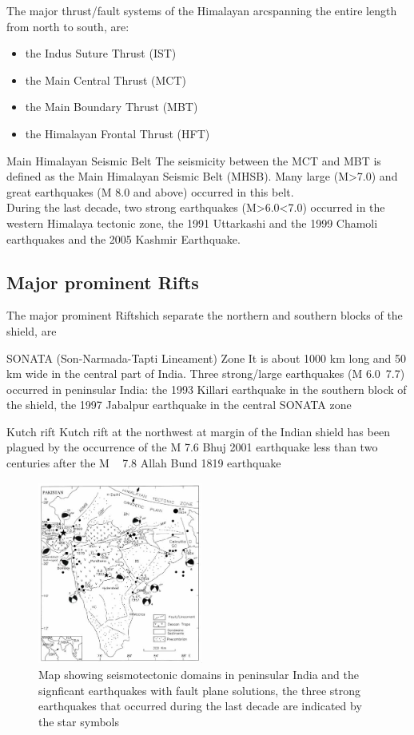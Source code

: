 \documentclass[smaller]{beamer}
\begin{document}
\begin{frame}{The major thrust/fault systems of the Himalayan arc}{spanning the entire
length from north to south, are:}
\begin{itemize}
	\item the Indus Suture Thrust (IST)
	\item the Main Central Thrust (MCT)
	\item the Main Boundary Thrust (MBT)
	\item the Himalayan Frontal Thrust (HFT)
\end{itemize}
\begin{block}{Main Himalayan Seismic Belt}
The seismicity between the MCT
and MBT is defined as the Main Himalayan Seismic Belt
(MHSB).
Many large (M>7.0) and great earthquakes
(M 8.0 and above) occurred in this belt.\\
During the last decade, two strong earthquakes
(M>6.0<7.0) occurred in the western Himalaya tectonic
zone, the 1991 Uttarkashi and the 1999 Chamoli
earthquakes and the 2005 Kashmir Earthquake.
\end{block}
\end{frame}
\subsection{Major prominent Rifts}
\begin{frame}{The major prominent Rifts}{hich separate the northern and southern blocks of the shield, are}
  \begin{block}{SONATA (Son-Narmada-Tapti Lineament) Zone}
	It is about 1000 km long and 50 km wide in the central part of India.
Three strong/large earthquakes (M 6.0~7.7) occurred in peninsular India: the 1993 Killari
earthquake in the southern block of the shield, the 1997
Jabalpur earthquake in the central SONATA zone
	\end{block}
	\begin{block}{Kutch rift}
	Kutch rift at the northwest at margin of the Indian shield has been plagued by the occurrence of the M 7.6 Bhuj 2001
earthquake less than two centuries after the M ~ 7.8 Allah Bund 1819 earthquake
	\end{block}
\end{frame}
\begin{frame}
\begin{figure}
\includegraphics[height=6cm]{flmap.png}
\caption{Map showing seismotectonic domains in peninsular India and the signficant earthquakes with fault plane solutions, the three strong
earthquakes that occurred during the last decade are indicated by the star symbols}
\end{figure}
\end{frame}
\end{document}
